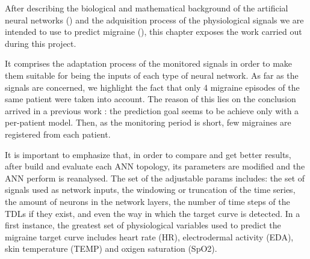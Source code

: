 \label{chapter:application}

After describing the biological and mathematical background of the artificial neural networks () and the adquisition process of the physiological signals we are intended to use to predict migraine (), this chapter exposes the work carried out during this project.


It comprises the adaptation process of the monitored signals in order to make them suitable for being the inputs of each type of neural network. 
As far as the signals are concerned, we highlight the fact that only 4 migraine episodes of the same patient were taken into account. 
The reason of this lies on the conclusion arrived in a previous work \cite{Irene:PFC:2014}: 
the prediction goal seems to be achieve only with a per-patient model. 
Then, as the monitoring period is short, few migraines are registered from each patient.


It is important to emphasize that,
in order to compare and get better results,
after build and evaluate each ANN topology,
its parameters are modified and the ANN perform is reanalysed. 
The set of the adjustable params includes:
the set of signals used as network inputs,
the windowing or truncation of the time series,
the amount of neurons in the network layers, 
the number of time steps of the TDLs if they exist, 
and even the way in which the target curve is detected.
In a first instance, the greatest set of physiological variables used to predict the migraine target curve includes heart rate (HR), electrodermal activity (EDA), skin temperature (TEMP) and oxigen saturation (SpO2).